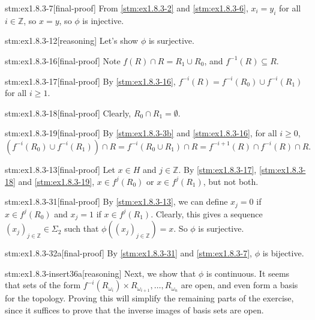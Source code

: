 \begin{stm}{stm:ex1.8.3-7}[final-proof]
From \ref{stm:ex1.8.3-2} and \ref{stm:ex1.8.3-6}, $x_i = y_i$ for all $i \in \mathbb{Z}$, so $x = y$, so $\phi$ is injective.
\end{stm}

\begin{stm}{stm:ex1.8.3-12}[reasoning]
Let's show $\phi$ is surjective.
\end{stm}

\begin{stm}{stm:ex1.8.3-16}[final-proof]
Note $f(R) \cap R = R_1 \cup R_0$, and $f^{-1}(R) \subseteq R$.
\end{stm}

\begin{stm}{stm:ex1.8.3-17}[final-proof]
By \ref{stm:ex1.8.3-16}, $f^{-i}(R) = f^{-i}(R_0) \cup f^{-i}(R_1)$ for all $i \geq 1$.
\end{stm}

\begin{stm}{stm:ex1.8.3-18}[final-proof]
Clearly, $R_0 \cap R_1 = \emptyset$.
\end{stm}

\begin{stm}{stm:ex1.8.3-19}[final-proof]
By \ref{stm:ex1.8.3-3b} and \ref{stm:ex1.8.3-16}, for all $i \ge 0$,
\[
\left(f^{-i}(R_0) \cup f^{-i}(R_1)\right) \cap R = f^{-i}(R_0 \cup R_1) \cap R = f^{-i+1}(R) \cap f^{-i}(R) \cap R.
\]
\end{stm}

\begin{stm}{stm:ex1.8.3-13}[final-proof]
Let $x \in H$ and $j \in \mathbb{Z}$. By \ref{stm:ex1.8.3-17}, \ref{stm:ex1.8.3-18} and \ref{stm:ex1.8.3-19}, $x \in f^j(R_0)$ or $x \in f^j(R_1)$, but not both.
\end{stm}

\begin{stm}{stm:ex1.8.3-31}[final-proof]
By \ref{stm:ex1.8.3-13}, we can define $x_j = 0$ if $x \in f^j(R_0)$ and $x_j = 1$ if $x \in f^j(R_1)$.  Clearly, this gives a sequence $(x_j)_{j \in \mathbb{Z}} \in \Sigma_2$ such that $\phi((x_j)_{j \in \mathbb{Z}}) = x$.
So $\phi$ is surjective.
\end{stm}

\begin{stm}{stm:ex1.8.3-32a}[final-proof]
By \ref{stm:ex1.8.3-31} and \ref{stm:ex1.8.3-7}, $\phi$ is bijective.
\end{stm}

\begin{stm}{stm:ex1.8.3-insert36a}[reasoning]
Next, we show that $\phi$ is continuous. It seems that sets of the form $f^{-i}(R_{\omega_i}) \times R_{\omega_{i+1}}, \ldots, R_{\omega_n}$ are open, and even form a basis for the topology. Proving this will simplify the remaining parts of the exercise, since it suffices to prove that the inverse images of basis sets are open.
\end{stm}

